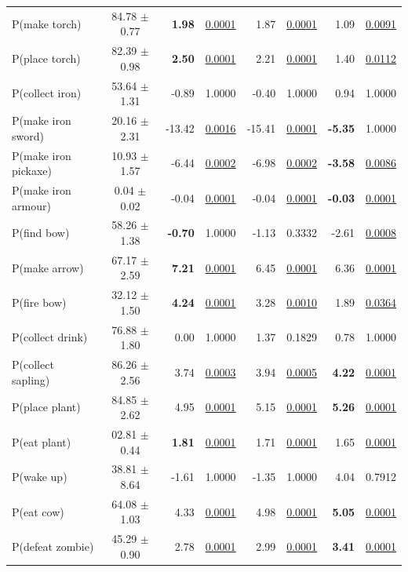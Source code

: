 \documentclass[final]{nesy2026}
\newcommand{\uu}[1]{\underline{#1}}
\newcommand{\bb}[1]{\textbf{#1}}
\begin{document}
\begin{table}[htbp]
\begin{tabular}{lcrcrcrc}
P(make torch)            & 84.78 $\pm$ 0.77 &  \bb{1.98} & \uu{0.0001}&      1.87  & \uu{0.0001}&      1.09  & \uu{0.0091}\\
P(place torch)           & 82.39 $\pm$ 0.98 &  \bb{2.50} & \uu{0.0001}&      2.21  & \uu{0.0001}&      1.40  & \uu{0.0112}\\
P(collect iron)          & 53.64 $\pm$ 1.31 &     -0.89  &     1.0000 &     -0.40  &     1.0000 &      0.94  &     1.0000 \\
P(make iron sword)       & 20.16 $\pm$ 2.31 &     -13.42 & \uu{0.0016}&     -15.41 & \uu{0.0001}& \bb{-5.35} &     1.0000 \\
P(make iron pickaxe)     & 10.93 $\pm$ 1.57 &     -6.44  & \uu{0.0002}&     -6.98  & \uu{0.0002}& \bb{-3.58} & \uu{0.0086}\\
P(make iron armour)      &  0.04 $\pm$ 0.02 &     -0.04  & \uu{0.0001}&     -0.04  & \uu{0.0001}& \bb{-0.03} & \uu{0.0001}\\
P(find bow)              & 58.26 $\pm$ 1.38 & \bb{-0.70} &     1.0000 &     -1.13  &     0.3332 &     -2.61  & \uu{0.0008}\\
P(make arrow)            & 67.17 $\pm$ 2.59 &  \bb{7.21} & \uu{0.0001}&      6.45  & \uu{0.0001}&      6.36  & \uu{0.0001}\\
P(fire bow)              & 32.12 $\pm$ 1.50 &  \bb{4.24} & \uu{0.0001}&      3.28  & \uu{0.0010}&      1.89  & \uu{0.0364}\\
P(collect drink)         & 76.88 $\pm$ 1.80 &      0.00  &     1.0000 &      1.37  &     0.1829 &      0.78  &     1.0000 \\
P(collect sapling)       & 86.26 $\pm$ 2.56 &      3.74  & \uu{0.0003}&      3.94  & \uu{0.0005}&  \bb{4.22} & \uu{0.0001}\\
P(place plant)           & 84.85 $\pm$ 2.62 &      4.95  & \uu{0.0001}&      5.15  & \uu{0.0001}&  \bb{5.26} & \uu{0.0001}\\
P(eat plant)             & 02.81 $\pm$ 0.44 &  \bb{1.81} & \uu{0.0001}&      1.71  & \uu{0.0001}&      1.65  & \uu{0.0001}\\
P(wake up)               & 38.81 $\pm$ 8.64 &     -1.61  &     1.0000 &     -1.35  &     1.0000 &      4.04  &     0.7912 \\
P(eat cow)               & 64.08 $\pm$ 1.03 &      4.33  & \uu{0.0001}&      4.98  & \uu{0.0001}&  \bb{5.05} & \uu{0.0001}\\
P(defeat zombie)         & 45.29 $\pm$ 0.90 &      2.78  & \uu{0.0001}&      2.99  & \uu{0.0001}&  \bb{3.41} & \uu{0.0001}\\

\end{tabular}
\end{table}
\end{document}
